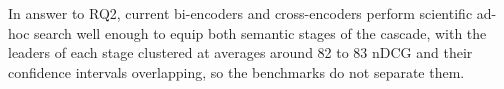 In answer to RQ2, current bi-encoders and cross-encoders perform scientific ad-hoc search well enough to equip both semantic stages of the cascade, with the leaders of each stage clustered at averages around 82 to 83 nDCG and their confidence intervals overlapping, so the benchmarks do not separate them.

